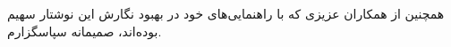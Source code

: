 



\begin{center}
\end{center}

همچنین از همکاران عزیزی که با راهنمایی‌های خود در بهبود نگارش این نوشتار
سهیم بوده‌اند، صمیمانه سپاسگزارم.

